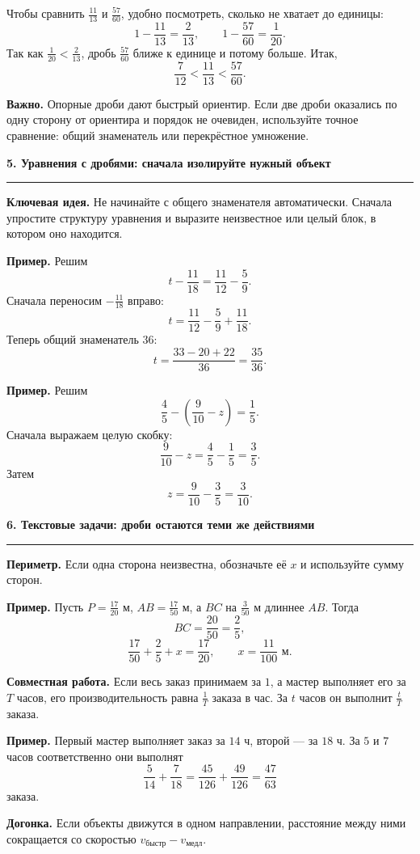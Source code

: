 \documentclass[a4paper,12pt]{article}
\newcommand{\sectiontitle}[1]{%
  \vspace{0.7em}
  {\large\bfseries\color{darkaccent}#1}\par
  \vspace{0.2em}\color{linegray}\hrule\color{textgray}\vspace{0.55em}
}
\newcommand{\keyidea}[1]{\textbf{Ключевая идея.} #1}
\newcommand{\warning}[1]{\textbf{Важно.} #1}
\newcommand{\ex}[1]{\textbf{Пример.} #1}
\begin{document}
Чтобы сравнить \(\frac{11}{13}\) и \(\frac{57}{60}\), удобно посмотреть, сколько не хватает до единицы:
\[
1-\frac{11}{13}=\frac2{13},\qquad
1-\frac{57}{60}=\frac1{20}.
\]
Так как \(\frac1{20}<\frac2{13}\), дробь \(\frac{57}{60}\) ближе к единице и потому больше. Итак,
\[
\boxed{\frac7{12}<\frac{11}{13}<\frac{57}{60}}.
\]

\warning{Опорные дроби дают быстрый ориентир. Если две дроби оказались по одну сторону от ориентира и порядок не очевиден, используйте точное сравнение: общий знаменатель или перекрёстное умножение.}

\sectiontitle{5. Уравнения с дробями: сначала изолируйте нужный объект}

\keyidea{Не начинайте с общего знаменателя автоматически. Сначала упростите структуру уравнения и выразите неизвестное или целый блок, в котором оно находится.}

\ex{Решим}
\[
t-\frac{11}{18}=\frac{11}{12}-\frac59.
\]
Сначала переносим \(-\frac{11}{18}\) вправо:
\[
t=\frac{11}{12}-\frac59+\frac{11}{18}.
\]
Теперь общий знаменатель \(36\):
\[
t=\frac{33-20+22}{36}=\boxed{\frac{35}{36}}.
\]

\ex{Решим}
\[
\frac45-\left(\frac9{10}-z\right)=\frac15.
\]
Сначала выражаем целую скобку:
\[
\frac9{10}-z=\frac45-\frac15=\frac35.
\]
Затем
\[
z=\frac9{10}-\frac35=\boxed{\frac3{10}}.
\]

\sectiontitle{6. Текстовые задачи: дроби остаются теми же действиями}

\textbf{Периметр.} Если одна сторона неизвестна, обозначьте её \(x\) и используйте сумму сторон.

\ex{Пусть \(P=\frac{17}{20}\) м, \(AB=\frac{17}{50}\) м, а \(BC\) на \(\frac3{50}\) м длиннее \(AB\). Тогда}
\[
BC=\frac{20}{50}=\frac25,
\]
\[
\frac{17}{50}+\frac25+x=\frac{17}{20},
\qquad
x=\boxed{\frac{11}{100}\text{ м}}.
\]

\textbf{Совместная работа.} Если весь заказ принимаем за \(1\), а мастер выполняет его за \(T\) часов, его производительность равна \(\frac1T\) заказа в час. За \(t\) часов он выполнит \(\frac{t}{T}\) заказа.

\ex{Первый мастер выполняет заказ за \(14\) ч, второй --- за \(18\) ч. За \(5\) и \(7\) часов соответственно они выполнят}
\[
\frac5{14}+\frac7{18}=\frac{45}{126}+\frac{49}{126}=\boxed{\frac{47}{63}}
\]
заказа.

\textbf{Догонка.} Если объекты движутся в одном направлении, расстояние между ними сокращается со скоростью \(v_{\text{быстр}}-v_{\text{медл}}\).
\end{document}
